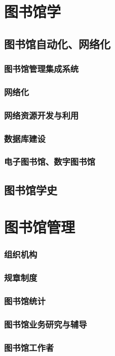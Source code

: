 \documentclass[UTF8]{../../ApplicationUniverse}
\begin{document}
\section{图书馆学}
    \subsection{图书馆自动化、网络化}
        \subsubsection{图书馆管理集成系统}
        \subsubsection{网络化}
        \subsubsection{网络资源开发与利用}
        \subsubsection{数据库建设}
        \subsubsection{电子图书馆、数字图书馆}
    \subsection{图书馆学史}


\section{图书馆管理}
    \subsubsection{组织机构}
    \subsubsection{规章制度}
    \subsubsection{图书馆统计}
    \subsubsection{图书馆业务研究与辅导}
    \subsubsection{图书馆工作者}
\end{document}
